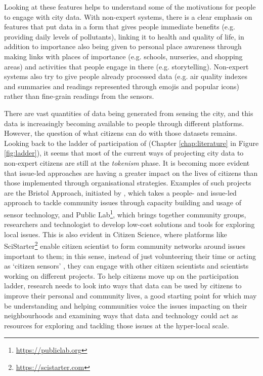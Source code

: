 Looking at these features helps to understand some of the motivations for people to engage with city data. With non-expert systems, there is a clear emphasis on features that put data in a form that gives people immediate benefits (e.g. providing daily levels of pollutants), linking it to health and quality of life, in addition to importance also being given to personal place awareness through making links with places of importance (e.g. schools, nurseries, and shopping areas) and activities that people engage in there (e.g. storytelling). Non-expert systems also try to give people already processed data (e.g. air quality indexes and summaries and readings represented through emojis and popular icons) rather than fine-grain readings from the sensors.

There are vast quantities of data being generated from sensing the city, and this data is increasingly becoming available to people through different platforms. However, the question of what citizens can do with those datasets remains. Looking back to the ladder of participation of \citet{arnstein_ladder_1969} (Chapter \ref{chap:literature} in Figure \ref{fig:ladder}), it seems that most of the current ways of projecting city data to non-expert citizens are still at the \textit{tokenism} phase. It is becoming more evident that issue-led approaches are having a greater impact on the lives of citizens than those implemented through organisational strategies. Examples of such projects are the Bristol Approach, initiated by \citet{balestrini_city_2017}, which takes a people- and issue-led approach to tackle community issues through capacity building and usage of sensor technology, and Public Lab\footnote{\url{https://publiclab.org}}, which brings together community groups, researchers and technologist to develop low-cost solutions and tools for exploring local issues. This is also evident in Citizen Science, where platforms like SciStarter\footnote{\url{https://scistarter.com}} enable citizen scientist to form community networks around issues important to them; in this sense, instead of just volunteering their time or acting as `citizen sensors' \citep{goodchild_citizens_2007}, they can engage with other citizen scientists and scientists working on different projects. To help citizens move up on the participation ladder, research needs to look into ways that data can be used by citizens to improve their personal and community lives, a good starting point for which may be understanding and helping communities voice the issues impacting on their neighbourhoods and examining ways that data and technology could act as resources for exploring and tackling those issues at the hyper-local scale.


